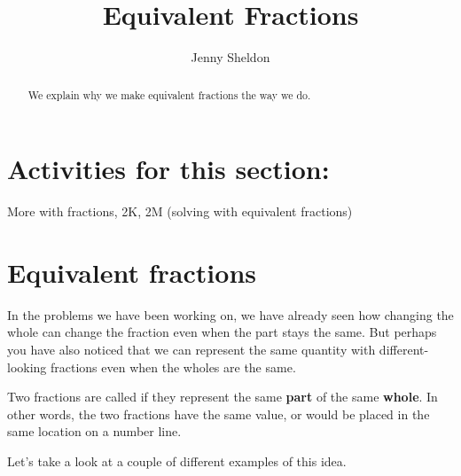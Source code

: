 \documentclass{ximera}
\title{Equivalent Fractions}
\author{Jenny Sheldon}
\begin{document}
\begin{abstract}
We explain why we make equivalent fractions the way we do.
\end{abstract}
\maketitle

\section{Activities for this section:}  More with fractions, 2K, 2M (solving with equivalent fractions)


\section{Equivalent fractions}

In the problems we have been working on, we have already seen how changing the whole can change the fraction even when the part stays the same. But perhaps you have also noticed that we can represent the same quantity with different-looking fractions even when the wholes are the same.

\begin{definition}
Two fractions are called  if they represent the same {\bf part} of the same {\bf whole}. In other words, the two fractions have the same value, or would be placed in the same location on a number line.
\end{definition}

Let's take a look at a couple of different examples of this idea.
\end{document}
